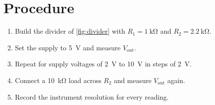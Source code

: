\section{Procedure}

\begin{enumerate}
  \item Build the divider of \cref{fig:divider} with $R_1=\qty{1}{\kilo\ohm}$ and $R_2=\qty{2.2}{\kilo\ohm}$.
  \item Set the supply to \qty{5}{\volt} and measure $V_\mathrm{out}$.
  \item Repeat for supply voltages of \qty{2}{\volt} to \qty{10}{\volt} in steps of \qty{2}{\volt}.
  \item Connect a \qty{10}{\kilo\ohm} load across $R_2$ and measure $V_\mathrm{out}$ again.
  \item Record the instrument resolution for every reading.
\end{enumerate}
